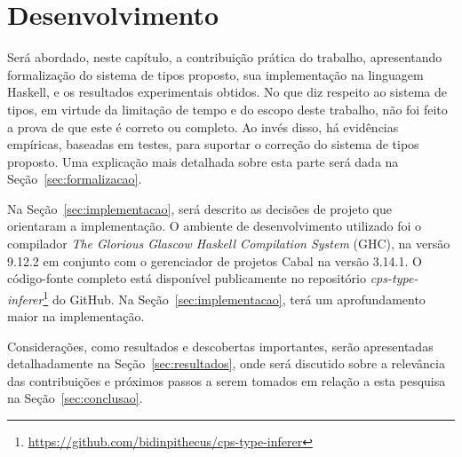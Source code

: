 \chapter{Desenvolvimento}\label{ch:desenvolvimento}

Será abordado, neste capítulo, a contribuição prática do trabalho, apresentando formalização do sistema de tipos proposto, sua implementação na linguagem Haskell, e os resultados experimentais obtidos.
No que diz respeito ao sistema de tipos, em virtude da limitação de tempo e do escopo deste trabalho, não foi feito a prova de que este é correto ou completo.
Ao invés disso, há evidências empíricas, baseadas em testes, para suportar o correção do sistema de tipos proposto.
Uma explicação mais detalhada sobre esta parte será dada na Seção~\ref{sec:formalizacao}.

Na Seção~\ref{sec:implementacao}, será descrito as decisões de projeto que orientaram a implementação. 
O ambiente de desenvolvimento utilizado foi o compilador \textit{The Glorious Glascow Haskell Compilation System} (GHC), na versão 9.12.2 em conjunto com o gerenciador de projetos Cabal na versão 3.14.1.
O código-fonte completo está disponível publicamente no repositório \textit{cps-type-inferer}\footnote{\url{https://github.com/bidinpithecus/cps-type-inferer}} do GitHub.
Na Seção~\ref{sec:implementacao}, terá um aprofundamento maior na implementação.

Considerações, como resultados e descobertas importantes, serão apresentadas detalhadamente na Seção~\ref{sec:resultados}, onde será discutido sobre a relevância das contribuições e próximos passos a serem tomados em relação a esta pesquisa na Seção~\ref{sec:conclusao}.






